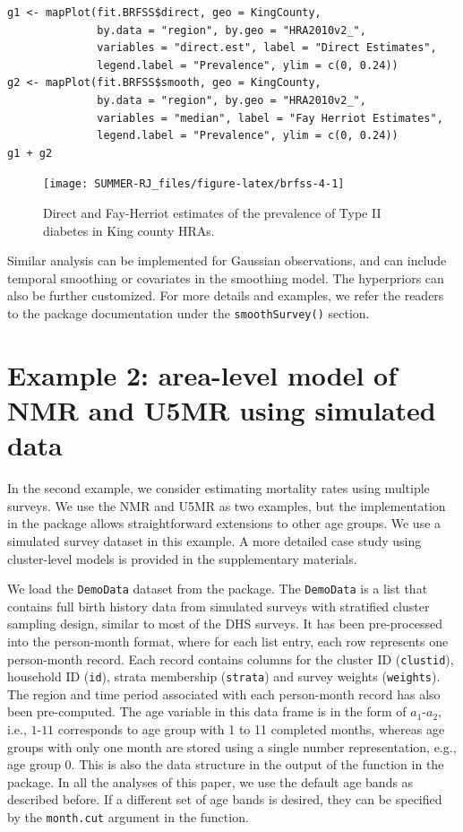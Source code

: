 \begin{verbatim}
g1 <- mapPlot(fit.BRFSS$direct, geo = KingCounty, 
              by.data = "region", by.geo = "HRA2010v2_", 
              variables = "direct.est", label = "Direct Estimates", 
              legend.label = "Prevalence", ylim = c(0, 0.24))
g2 <- mapPlot(fit.BRFSS$smooth, geo = KingCounty, 
              by.data = "region", by.geo = "HRA2010v2_", 
              variables = "median", label = "Fay Herriot Estimates", 
              legend.label = "Prevalence", ylim = c(0, 0.24))
g1 + g2
\end{verbatim}

\begin{figure}[!ht]
\texttt{[image: SUMMER-RJ\_files/figure-latex/brfss-4-1]} \caption{Direct and Fay-Herriot estimates of the prevalence of Type II diabetes in King county HRAs.}\label{fig:brfss-4}
\end{figure}

Similar analysis can be implemented for Gaussian observations, and can include temporal smoothing or covariates in the smoothing model. The hyperpriors can also be further customized. For more details and examples, we refer the readers to the package documentation under the \texttt{smoothSurvey()} section.

\section{Example 2: area-level model of NMR and U5MR using simulated data}\label{example-2-area-level-model-of-nmr-and-u5mr-using-simulated-data}

In the second example, we consider estimating mortality rates using multiple surveys. We use the NMR and U5MR as two examples, but the implementation in the  package allows straightforward extensions to other age groups. We use a simulated survey dataset in this example. A more detailed case study using cluster-level models is provided in the supplementary materials.

We load the \texttt{DemoData} dataset from the  package. The \texttt{DemoData} is a list that contains full birth history data from simulated surveys with stratified cluster sampling design, similar to most of the DHS surveys. It has been pre-processed into the person-month format, where for each list entry, each row represents one person-month record. Each record contains columns for the cluster ID (\texttt{clustid}), household ID (\texttt{id}), strata membership (\texttt{strata}) and survey weights (\texttt{weights}). The region and time period associated with each person-month record has also been pre-computed. The age variable in this data frame is in the form of \(a_1\)-\(a_2\), i.e., \(1\)-\(11\) corresponds to age group with 1 to 11 completed months, whereas age groups with only one month are stored using a single number representation, e.g., age group \(0\). This is also the data structure in the output of the  function in the  package. In all the analyses of this paper, we use the default age bands as described before. If a different set of age bands is desired, they can be specified by the \texttt{month.cut} argument in the  function.

